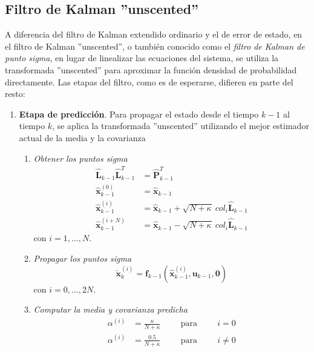 \subsection{Filtro de Kalman ''unscented''}
A diferencia del filtro de Kalman extendido ordinario y el de error de estado, en el filtro de Kalman ''unscented'', o también conocido como el \textit{filtro de Kalman de punto sigma}, en lugar de linealizar las ecuaciones del sistema, se utiliza la transformada ''unscented'' para aproximar la función densidad de probabilidad directamente. Las etapas del filtro, como es de esperarse, difieren en parte del resto:
\begin{enumerate}
    \item \textbf{Etapa de predicción}. Para propagar el estado desde el tiempo $k-1$ al tiempo $k$, se aplica la transformada ''unscented'' utilizando el mejor estimador actual de la media y la covarianza
    \begin{enumerate}
        \item \textit{Obtener los puntos sigma}
        \begin{align}
            \hat{\bm{L}}_{k-1}\hat{\bm{L}}_{k-1}^T &= \hat{\bm{P}}_{k-1}^T \\
            \hat{\bm{x}}_{k-1}^{(0)} &= \hat{\bm{x}}_{k-1} \\
            \hat{\bm{x}}_{k-1}^{(i)} &= \hat{\bm{x}}_{k-1} + \sqrt{N+\kappa}\ col_i\hat{\bm{L}}_{k-1} \\
            \hat{\bm{x}}_{k-1}^{(i+N)} &= \hat{\bm{x}}_{k-1} - \sqrt{N+\kappa}\ col_i\hat{\bm{L}}_{k-1}            
        \end{align}
        con $i=1,...,N$.
        \item \textit{Propagar los puntos sigma}
        \begin{equation}
            \check{\bm{x}}_k^{(i)} = \bm{f}_{k-1}\left(\hat{\bm{x}}_{k-1}^{(i)},\bm{u}_{k-1},\bm{0}\right)
        \end{equation}
        con $i=0,...,2N$.
        \item \textit{Computar la media y covarianza predicha}
        \begin{align}
            \alpha^{(i)} &= \frac{\kappa}{N+\kappa}\hspace{1cm}\text{para}\hspace{1cm}i = 0 \\
            \alpha^{(i)} &= \frac{0.5}{N+\kappa}\hspace{1cm}\text{para}\hspace{1cm}i \neq 0 \\

\end{align}
\end{enumerate}
\end{enumerate}
